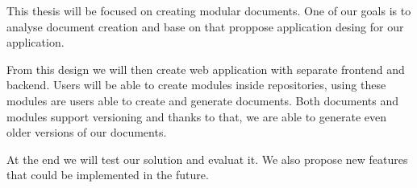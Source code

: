 This thesis will be focused on creating modular documents. One of our goals is to analyse document creation and base on
that proppose application desing for our application.

From this design we will then create web application with separate frontend and backend.
Users will be able to create modules inside repositories, using these modules are users
able to create and generate documents. Both documents and modules support versioning
and thanks to that, we are able to generate even older versions of our documents.

At the end we will test our solution and evaluat it. We also propose new features that could
be implemented in the future.
